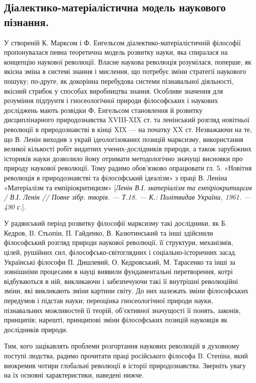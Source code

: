 \subsection{Діалектико-матеріалістична модель наукового пізнання.} У створеній
К. Марксом і Ф. Енгельсом діалектико-матеріалістичній філософії
пропонувалася певна теоретична модель розвитку науки, яка спиралася на
концепцію наукової революції. Власне наукова революція розумілася, поперше, як якісна зміна в системі знання і мислення, що потребує зміни стратегії
наукового пошуку; по-друге, як докорінна перебудова системи пізнавальної
діяльності, якісний стрибок у способах виробництва знання. Особливе значення
для розуміння підґрунтя і гносеологічної природи філософських і наукових
досліджень мають розвідки Ф. Енгельсом становлення й розвитку
дисциплінарного природознавства XVIII-XIX ст. та ленінський розгляд
новітньої революції в природознавстві в кінці XIX --- на початку XX ст.
Незважаючи на те, що В. Ленін виходив з украй ідеологізованих позицій
марксизму, використання великої кількості робіт видатних учених-дослідників
природи, а також зарубіжних істориків науки дозволило йому отримати
методологічно значущі висновки про природу наукової революції. Тому радимо
обов’язково опрацювати гл. 5. «Новітня революція в природознавстві та
філософський ідеалізм» з праці В. Леніна «Матеріалізм та емпіріокритицизм»
[\textit{Ленін В.І. матеріалізм та емпіріокритицизм / В.І. Ленін // Повне зібр. творів.
--- Т.18. --- К.: Політвидав України, 1961. --- 490 с.}].

У радянський період розвитку філософії марксизму такі дослідники, як Б.
Кедров, B. Стьопін, П. Гайденко, В. Казютинський та інші здійснили
філософський розгляд природи наукової революції, її структури, механізмів,
цілей, рушійних сил, філософсько-світоглядних і соціально-історичних засад.
Українські філософи П. Дишлевий, О. Кедровський, М. Тарасенко та інші за
зовнішніми процесами в науці виявили фундаментальні перетворення, котрі
відбуваються в ній, викликаючи і забезпечуючи такі її внутрішні революційні
зміни, які викликають зміни картини світу. До них належать зміни
філософських передумов і підстав науки; переоцінка гносеологічної природи
науки, пізнавальних можливостей її теорій, об’єктивної значущості її понять,
законів, принципів; нарешті, принципові зміни філософських позицій науковців
як дослідників природи.

Тим, кого зацікавлять проблеми розгортання наукових революцій в
духовному поступі людства, радимо прочитати праці російського філософа B.
Степіна, який виокремив чотири глобальні революції в історії природознавства.
Зверніть увагу на їх основні характеристики, наведені нижче.

